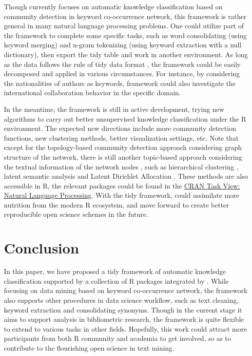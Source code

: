 Though  currently focuses on automatic knowledge
classification based on community detection in keyword co-occurrence
network, this framework is rather general in many natural language
processing problems. One could utilize part of the framework to complete
some specific tasks, such as word consolidating (using keyword merging)
and n-gram tokenizing (using keyword extraction with a null dictionary),
then export the tidy table and work in another environment. As long as
the data follows the rule of tidy data format \citep{wickham2014tidy},
the  framework could be easily decomposed and applied in
various circumstances. For instance, by considering the nationalities of
authors as keywords,  framework could also investigate the
international collaboration behavior in the specific domain.

In the meantime, the  framework is still in active
development, trying new algorithms to carry out better unsupervised
knowledge classification under the R environment. The expected new
directions include more community detection functions, new clustering
methods, better visualization settings, etc. Note that except for the
topology-based community detection approach considering graph structure
of the network, there is still another topic-based approach considering
the textual information of the network nodes \citep{Ding-629}, such as
hierarchical clustering \citep{Newman-633}, latent semantic analysis
\citep{LandauerFoltz-635} and Latent Dirichlet Allocation
\citep{BleiNg-634}. These methods are also accessible in R, the relevant
packages could be found in the
\href{https://cran.r-project.org/web/views/NaturalLanguageProcessing.html}{CRAN
Task View: Natural Language Processing}. With the tidy framework,
 could assimilate more nutrition from the modern R
ecosystem, and move forward to create better reproducible open science
schemes in the future.

\hypertarget{conclusion}{%
\section{Conclusion}\label{conclusion}}

In this paper, we have proposed a tidy framework of automatic knowledge
classification supported by a collection of R packages integrated by
. While focusing on data mining based on keyword
co-occurrence network, the framework also supports other procedures in
data science workflow, such as text cleaning, keyword extraction and
consolidating synonyms. Though in the current stage it aims to support
analysis in bibliometric research, the framework is quite flexible to
extend to various tasks in other fields. Hopefully, this work could
attract more participants from both R community and academia to get
involved, so as to contribute to the flourishing open science in text
mining.

